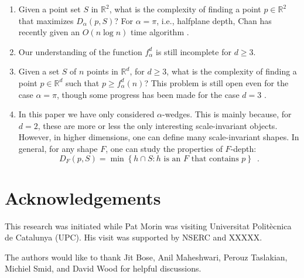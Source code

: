 \documentclass[lotsofwhite]{patmorin}
\begin{document}
\begin{enumerate}
\item Given a point set $S$ in $\mathbb{R}^2$, what is the complexity
of finding a point $p\in\mathbb{R}^2$ that maximizes $D_\alpha(p,S)$?
For $\alpha=\pi$, i.e., halfplane depth, Chan has recently given an
$O(n\log n)$ time algorithm \cite{c04}.

\item Our understanding of the function $f^d_\alpha$ is still
incomplete for $d\ge 3$.

\item Given a set $S$ of $n$ points in $\mathbb{R}^d$, for $d\ge 3$,
what is the complexity of finding a point $p\in \mathbb{R}^d$ such
that $p\ge f_\alpha^d(n)$?  This problem is still open even for the
case $\alpha=\pi$, though some progress has been made for the case
$d=3$ \cite{X}.

\item In this paper we have only considered $\alpha$-wedges.  This is
mainly because, for $d=2$, these are more or less the only interesting
scale-invariant objects.  However, in higher dimensions, one can
define many scale-invariant shapes.  In general, for any shape $F$,
one can study the properties of $F$-depth:
\[
  D_F(p,S) = \min\left\{ 
     h\cap S : \mbox{$h$ is an $F$ that contains $p$}
  \right\} \enspace .
\] 
\end{enumerate}

\section*{Acknowledgements}

This research was initiated while Pat Morin was visiting Universitat
Polit\`ecnica de Catalunya (UPC).  His visit was supported by NSERC
and XXXXX.  

The authors would like to thank Jit Bose, Anil Maheshwari, Perouz
Taslakian, Michiel Smid, and David Wood for helpful discussions.



\end{document}
